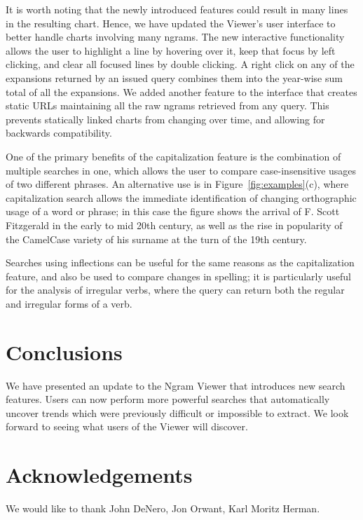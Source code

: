 \documentclass[11pt,a4paper]{article}
\begin{document}
It is worth noting that the newly introduced features could result in many lines in the resulting chart. Hence, we have updated the Viewer's user interface to better handle charts involving many ngrams. The new interactive functionality allows the user to highlight a line by hovering over it, keep that focus by left clicking, and clear all focused lines by double clicking. A right click on any of the expansions returned by an issued query combines them into the year-wise sum total of all the expansions. We added another feature to the interface that creates static URLs maintaining all the raw ngrams retrieved from any query. This prevents statically linked charts from changing over time, and allowing for backwards compatibility.

One of the primary benefits of the capitalization feature is the combination of multiple searches in one, which allows the user to compare case-insensitive usages of two different phrases. An alternative use is in Figure~\ref{fig:examples}(c), where capitalization search allows the immediate identification of changing orthographic usage of a word or phrase; in this case the figure shows the arrival of F. Scott Fitzgerald in the early to mid 20th century, as well as the rise in popularity of the CamelCase variety of his surname at the turn of the 19th century.

Searches using inflections can be useful for the same reasons as the capitalization feature, and also be used to compare changes in spelling; it is particularly useful for the analysis of irregular verbs, where the query can return both the regular and irregular forms of a verb.

\section{Conclusions}
We have presented an update to the Ngram Viewer that introduces new search features. Users can now perform more powerful searches that automatically uncover trends which were previously difficult or impossible to extract. We look forward to seeing what users of the Viewer will discover.

\section{Acknowledgements}
We would like to thank John DeNero, Jon Orwant, Karl Moritz Herman.


\let\oldbibliography\thebibliography
\renewcommand{\thebibliography}[1]{%
  \oldbibliography{#1}%
  \setlength{\itemsep}{0pt}%
}

\end{document}
